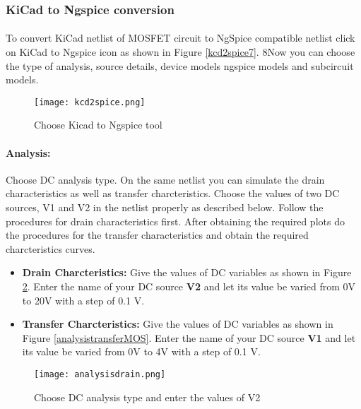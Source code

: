\subsubsection{KiCad to Ngspice conversion}

\paragraph{} To convert KiCad netlist of MOSFET circuit to NgSpice
compatible netlist click on KiCad to Ngspice icon as shown in Figure \ref{kcd2spice7}. 8Now you can choose the type of analysis, source details, device models ngspice models and subcircuit models.


\begin{figure}[h]
\centering
\texttt{[image: kcd2spice.png]}
\caption{Choose Kicad to Ngspice tool}
\label{kcd2spice8}
\end{figure}


\paragraph{Analysis:}Choose DC analysis type. On the same netlist you can simulate the drain characteristics as well as transfer charcteristics. Choose the values of two DC sources, V1 and V2 in the netlist properly as described below. Follow the procedures for drain characteristics first. After obtaining the required plots do the procedures for the transfer characteristics and obtain the required charcteristics curves.

\begin{itemize}
\item 
\textbf{Drain Charcteristics:} Give the values of DC variables as shown in Figure \ref{analysisdrainMOS}. Enter the name of your DC source \textbf{V2} and let its value be varied from 0V to 20V with a step of 0.1 V.


\item
 \textbf{Transfer Charcteristics:} Give the values of DC variables as shown in Figure \ref{analysistransferMOS}. Enter the name of your DC source \textbf{V1} and let its value be varied from 0V to 4V with a step of 0.1 V.


\end{itemize}

\begin{figure}[h]
\centering
\texttt{[image: analysisdrain.png]}
\caption{Choose DC analysis type and enter the values of V2}
\label{analysisdrainMOS}
\end{figure}

